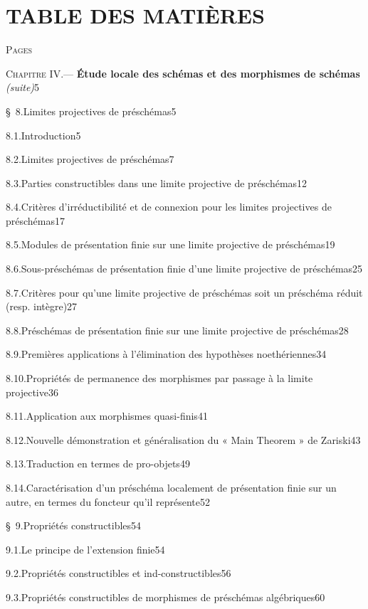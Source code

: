 \let\EGAIVthreeTerm\relax
\endgroup

\clearpage
\thispagestyle{empty}
\null

\clearpage
{}
{}
\section*{TABLE DES MATIÈRES}

\begingroup
\small
\setlength{\parindent}{0pt}
\setlength{\parskip}{1.5pt}
\hfill\textsc{Pages}\par
\newcommand{\EGAIVthreeContentsLine}[3]{#1\quad #2\unskip\nobreak\hspace{0.4em}\nobreak\dotfill\nobreak\mbox{#3}\par}

\EGAIVthreeContentsLine{\textsc{Chapitre IV.}}{--- \textbf{Étude locale des schémas et des morphismes de schémas} \emph{(suite)}}{5}
\EGAIVthreeContentsLine{\S~8.}{Limites projectives de préschémas}{5}
\EGAIVthreeContentsLine{8.1.}{Introduction}{5}
\EGAIVthreeContentsLine{8.2.}{Limites projectives de préschémas}{7}
\EGAIVthreeContentsLine{8.3.}{Parties constructibles dans une limite projective de préschémas}{12}
\EGAIVthreeContentsLine{8.4.}{Critères d'irréductibilité et de connexion pour les limites projectives de préschémas}{17}
\EGAIVthreeContentsLine{8.5.}{Modules de présentation finie sur une limite projective de préschémas}{19}
\EGAIVthreeContentsLine{8.6.}{Sous-préschémas de présentation finie d'une limite projective de préschémas}{25}
\EGAIVthreeContentsLine{8.7.}{Critères pour qu'une limite projective de préschémas soit un préschéma réduit (resp. intègre)}{27}
\EGAIVthreeContentsLine{8.8.}{Préschémas de présentation finie sur une limite projective de préschémas}{28}
\EGAIVthreeContentsLine{8.9.}{Premières applications à l'élimination des hypothèses noethériennes}{34}
\EGAIVthreeContentsLine{8.10.}{Propriétés de permanence des morphismes par passage à la limite projective}{36}
\EGAIVthreeContentsLine{8.11.}{Application aux morphismes quasi-finis}{41}
\EGAIVthreeContentsLine{8.12.}{Nouvelle démonstration et généralisation du « Main Theorem » de Zariski}{43}
\EGAIVthreeContentsLine{8.13.}{Traduction en termes de pro-objets}{49}
\EGAIVthreeContentsLine{8.14.}{Caractérisation d'un préschéma localement de présentation finie sur un autre, en termes du foncteur qu'il représente}{52}

\EGAIVthreeContentsLine{\S~9.}{Propriétés constructibles}{54}
\EGAIVthreeContentsLine{9.1.}{Le principe de l'extension finie}{54}
\EGAIVthreeContentsLine{9.2.}{Propriétés constructibles et ind-constructibles}{56}
\EGAIVthreeContentsLine{9.3.}{Propriétés constructibles de morphismes de préschémas algébriques}{60}

